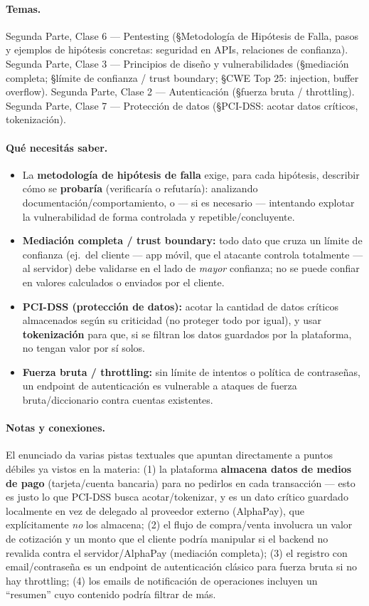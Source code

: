 \paragraph{Temas.}
Segunda Parte, Clase 6 --- Pentesting (\S Metodología de Hipótesis de Falla, pasos y
ejemplos de hipótesis concretas: seguridad en APIs, relaciones de confianza). Segunda
Parte, Clase 3 --- Principios de diseño y vulnerabilidades (\S mediación completa;
\S límite de confianza / trust boundary; \S CWE Top 25: injection, buffer overflow).
Segunda Parte, Clase 2 --- Autenticación (\S fuerza bruta / throttling). Segunda Parte,
Clase 7 --- Protección de datos (\S PCI-DSS: acotar datos críticos, tokenización).

\paragraph{Qué necesitás saber.}
\begin{itemize}
  \item La \textbf{metodología de hipótesis de falla} exige, para cada hipótesis,
  describir cómo se \textbf{probaría} (verificaría o refutaría): analizando
  documentación/comportamiento, o --- si es necesario --- intentando explotar la
  vulnerabilidad de forma controlada y repetible/concluyente.
  \item \textbf{Mediación completa / trust boundary:} todo dato que cruza un límite de
  confianza (ej.\ del cliente --- app móvil, que el atacante controla totalmente --- al
  servidor) debe validarse en el lado de \emph{mayor} confianza; no se puede confiar en
  valores calculados o enviados por el cliente.
  \item \textbf{PCI-DSS (protección de datos):} acotar la cantidad de datos críticos
  almacenados según su criticidad (no proteger todo por igual), y usar
  \textbf{tokenización} para que, si se filtran los datos guardados por la plataforma,
  no tengan valor por sí solos.
  \item \textbf{Fuerza bruta / throttling:} sin límite de intentos o política de
  contraseñas, un endpoint de autenticación es vulnerable a ataques de fuerza
  bruta/diccionario contra cuentas existentes.
\end{itemize}

\paragraph{Notas y conexiones.}
El enunciado da varias pistas textuales que apuntan directamente a puntos débiles ya
vistos en la materia: (1) la plataforma \textbf{almacena datos de medios de pago}
(tarjeta/cuenta bancaria) para no pedirlos en cada transacción --- esto es justo lo que
PCI-DSS busca acotar/tokenizar, y es un dato crítico guardado localmente en vez de
delegado al proveedor externo (AlphaPay), que explícitamente \emph{no} los almacena;
(2) el flujo de compra/venta involucra un valor de cotización y un monto que el cliente
podría manipular si el backend no revalida contra el servidor/AlphaPay (mediación
completa); (3) el registro con email/contraseña es un endpoint de autenticación clásico
para fuerza bruta si no hay throttling; (4) los emails de notificación de operaciones
incluyen un ``resumen'' cuyo contenido podría filtrar de más.

